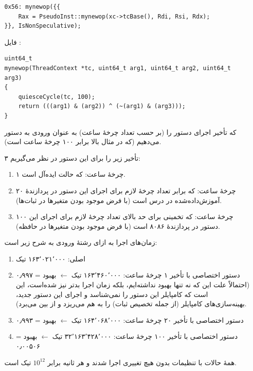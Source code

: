 \documentclass[12pt,titlepage,a4page , tikz , multi,table , svgnames,xcdraw]{article}
\begin{document}
\begin{latin}
\begin{verbatim}
0x56: mynewop({{
    Rax = PseudoInst::mynewop(xc->tcBase(), Rdi, Rsi, Rdx);
}}, IsNonSpeculative);
\end{verbatim}
\end{latin}


\par
فایل
:
\begin{latin}
\begin{lstlisting}[style=CStyle]
uint64_t
mynewop(ThreadContext *tc, uint64_t arg1, uint64_t arg2, uint64_t arg3)
{
    quiesceCycle(tc, 100);
    return (((arg1) & (arg2)) ^ (~(arg1) & (arg3)));
}
\end{lstlisting}
\end{latin}


\par
که تأخیر اجرای دستور را (بر حسب تعداد چرخهٔ ساعت) به عنوان ورودی به دستور
می‌دهیم (که در مثال بالا برابر ۱۰۰ چرخهٔ ساعت است).
\par
۳ تأخیر زیر را برای این دستور در نظر می‌گیریم:
\begin{enumerate}
\item
۱ چرخهٔ ساعت: که حالت ایده‌آل است.
\item
۲۰ چرخهٔ ساعت: که برابر تعداد چرخهٔ لازم برای اجرای این دستور در پردازندهٔ
آموزش‌داده‌شده در درس است (با فرض موجود بودن متغیرها در ثبات‌ها).
\item
۱۰۰ چرخهٔ ساعت: که تخمینی برای حد بالای تعداد چرخهٔ لازم برای اجرای این دستور در پردازندهٔ ۸۰۸۶ است (با فرض موجود بودن متغیرها در حافظه).
\end{enumerate}
زمان‌های اجرا به ازای رشتهٔ ورودی
 به شرح زیر است:
\begin{enumerate}
\item
{}
اصلی: ۱۶۳٬۰۲۱٬۰۰۰ تیک
\item
دستور اختصاصی با تأخیر ۱ چرخهٔ ساعت: ۱۶۳٬۴۶۰٬۰۰۰ تیک
$\leftarrow$
بهبود = ۰٫۹۹۷ (احتمالاً علت این که نه تنها بهبود نداشته‌ایم، بلکه زمان اجرا بدتر نیز شده‌است، این است که کامپایلر این دستور را نمی‌شناسد و اجرای این دستور جدید، بهینه‌سازی‌های کامپایلر (از جمله تخصیص ثبات) را به هم می‌ریزد و از بین می‌برد).
\item
دستور اختصاصی با تأخیر ۲۰ چرخهٔ ساعت: ۱۶۴٬۰۶۸٬۰۰۰ تیک
$\leftarrow$
بهبود = ۰٫۹۹۳
\item
دستور اختصاصی با تأخیر ۱۰۰ چرخهٔ ساعت: ۳۲٬۱۶۳٬۴۲۸٬۰۰۰ تیک
$\leftarrow$
بهبود = ۰٫۰۰۵۰۶
\end{enumerate}
همهٔ حالات با تنظیمات
بدون هیچ تغییری اجرا شدند و هر ثانیه برابر
$10^{12}$
تیک است.
\newpage
\end{document}
